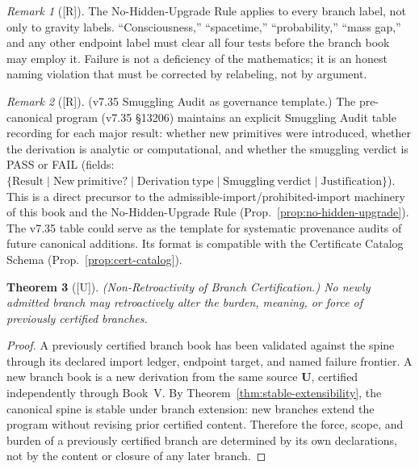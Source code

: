 \documentclass[12pt,oneside]{amsbook}
\theoremstyle{plain}
\newtheorem{theorem}{Theorem}[section]
\theoremstyle{definition}
\theoremstyle{remark}
\newtheorem{remark}[theorem]{Remark}
\newcommand{\status}[1]{\textup{[#1]}}
\begin{document}
\begin{remark}[\status{R}]
The No-Hidden-Upgrade Rule applies to every branch label, not only to
gravity labels.  ``Consciousness,'' ``spacetime,'' ``probability,''
``mass gap,'' and any other endpoint label must clear all four tests
before the branch book may employ it.  Failure is not a deficiency of
the mathematics; it is an honest naming violation that must be
corrected by relabeling, not by argument.
\end{remark}

\begin{remark}[\status{R}]
\textup{(v7.35 Smuggling Audit as governance template.)}
The pre-canonical program (v7.35 \S13206) maintains an explicit
Smuggling Audit table recording for each major result: whether new
primitives were introduced, whether the derivation is analytic or
computational, and whether the smuggling verdict is PASS or FAIL
(fields: $\{\mathrm{Result} \mid \mathrm{New\ primitive?} \mid
\mathrm{Derivation\ type} \mid \mathrm{Smuggling\ verdict} \mid
\mathrm{Justification}\}$).  This is a direct precursor to the
admissible-import/prohibited-import machinery of this book and the
No-Hidden-Upgrade Rule (Prop.~\ref{prop:no-hidden-upgrade}).  The
v7.35 table could serve as the template for systematic provenance
audits of future canonical additions.  Its format is compatible with
the Certificate Catalog Schema (Prop.~\ref{prop:cert-catalog}).
\end{remark}


\begin{theorem}[\status{U}]\label{thm:non-retroactive}
\textup{(Non-Retroactivity of Branch Certification.)}  No newly
admitted branch may retroactively alter the burden, meaning, or force
of previously certified branches.
\end{theorem}

\begin{proof}
A previously certified branch book has been validated against the spine
through its declared import ledger, endpoint target, and named failure
frontier.  A new branch book is a new derivation from the same source
$\mathbf{U}$, certified independently through Book~V.  By
Theorem~\ref{thm:stable-extensibility}, the canonical spine is stable
under branch extension: new branches extend the program without
revising prior certified content.  Therefore the force, scope, and
burden of a previously certified branch are determined by its own
declarations, not by the content or closure of any later branch.
\end{proof}
\end{document}

